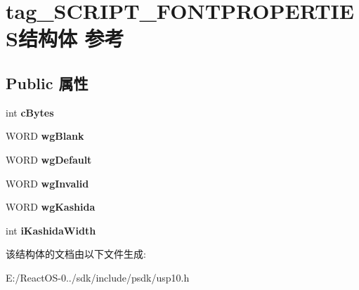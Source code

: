 \hypertarget{structtag___s_c_r_i_p_t___f_o_n_t_p_r_o_p_e_r_t_i_e_s}{}\section{tag\+\_\+\+S\+C\+R\+I\+P\+T\+\_\+\+F\+O\+N\+T\+P\+R\+O\+P\+E\+R\+T\+I\+E\+S结构体 参考}
\label{structtag___s_c_r_i_p_t___f_o_n_t_p_r_o_p_e_r_t_i_e_s}
\subsection*{Public 属性}
\begin{DoxyCompactItemize}
\item 
\mbox{\label{structtag___s_c_r_i_p_t___f_o_n_t_p_r_o_p_e_r_t_i_e_s_a14e7e0d684eec64cd3ec182693b9244c}} 
int {\bfseries c\+Bytes}
\item 
\mbox{\label{structtag___s_c_r_i_p_t___f_o_n_t_p_r_o_p_e_r_t_i_e_s_ad83e0cf746ba87e02f6d4374b707cd77}} 
W\+O\+RD {\bfseries wg\+Blank}
\item 
\mbox{\label{structtag___s_c_r_i_p_t___f_o_n_t_p_r_o_p_e_r_t_i_e_s_a1b69d068d7820e815fb9b5314e258b54}} 
W\+O\+RD {\bfseries wg\+Default}
\item 
\mbox{\label{structtag___s_c_r_i_p_t___f_o_n_t_p_r_o_p_e_r_t_i_e_s_a22ab31f8a9a32e3175a79a42215b57cf}} 
W\+O\+RD {\bfseries wg\+Invalid}
\item 
\mbox{\label{structtag___s_c_r_i_p_t___f_o_n_t_p_r_o_p_e_r_t_i_e_s_ac341695826a61f532c9c952b0ba6bbae}} 
W\+O\+RD {\bfseries wg\+Kashida}
\item 
\mbox{\label{structtag___s_c_r_i_p_t___f_o_n_t_p_r_o_p_e_r_t_i_e_s_ab9e900b7e28bbc4a6313d4e37f252439}} 
int {\bfseries i\+Kashida\+Width}
\end{DoxyCompactItemize}


该结构体的文档由以下文件生成\+:\begin{DoxyCompactItemize}
\item 
E\+:/\+React\+O\+S-\/0../sdk/include/psdk/usp10.\+h\end{DoxyCompactItemize}
